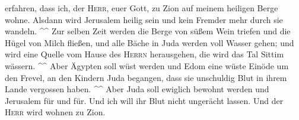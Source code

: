 erfahren, dass ich, der \textsc{Herr}, euer Gott, zu Zion auf meinem
heiligen Berge wohne. Alsdann wird Jerusalem heilig sein und kein
Fremder mehr durch sie wandeln. \^{}\^{}  Zur selben Zeit
werden die Berge von süßem Wein triefen und die Hügel von Milch fließen,
und alle Bäche in Juda werden voll Wasser gehen; und wird eine Quelle
vom Hause des \textsc{Herrn} herausgehen, die wird das Tal Sittim
wässern. \^{}\^{}  Aber Ägypten soll wüst werden und Edom
eine wüste Einöde um den Frevel, an den Kindern Juda begangen, dass sie
unschuldig Blut in ihrem Lande vergossen haben. \^{}\^{} 
Aber Juda soll ewiglich bewohnt werden und Jerusalem für und für.
 Und ich will ihr Blut nicht ungerächt lassen. Und der
\textsc{Herr} wird wohnen zu Zion.
